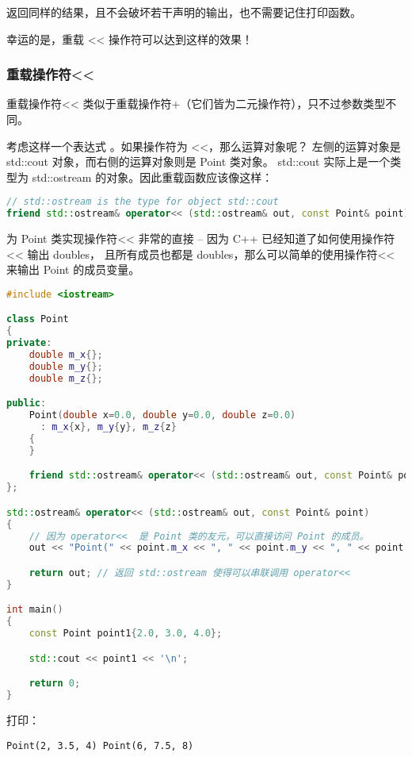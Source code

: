 \documentclass[../../LearnCpp.tex]{subfiles}
\begin{document}
返回同样的结果，且不会破坏若干声明的输出，也不需要记住打印函数。

幸运的是，重载 << 操作符可以达到这样的效果！

\subsubsection*{重载操作符<<}

重载操作符<< 类似于重载操作符+（它们皆为二元操作符），只不过参数类型不同。

考虑这样一个表达式 。如果操作符为 <<，那么运算对象呢？
左侧的运算对象是 std::cout 对象，而右侧的运算对象则是 Point 类对象。
std::cout 实际上是一个类型为 std::ostream 的对象。因此重载函数应该像这样：

\begin{lstlisting}[language=C++]
// std::ostream is the type for object std::cout
friend std::ostream& operator<< (std::ostream& out, const Point& point);
\end{lstlisting}

为 Point 类实现操作符<< 非常的直接 -- 因为 C++ 已经知道了如何使用操作符<< 输出 doubles，
且所有成员也都是 doubles，那么可以简单的使用操作符<< 来输出 Point 的成员变量。

\begin{lstlisting}[language=C++]
#include <iostream>

class Point
{
private:
    double m_x{};
    double m_y{};
    double m_z{};

public:
    Point(double x=0.0, double y=0.0, double z=0.0)
      : m_x{x}, m_y{y}, m_z{z}
    {
    }

    friend std::ostream& operator<< (std::ostream& out, const Point& point);
};

std::ostream& operator<< (std::ostream& out, const Point& point)
{
    // 因为 operator<<  是 Point 类的友元，可以直接访问 Point 的成员。
    out << "Point(" << point.m_x << ", " << point.m_y << ", " << point.m_z << ')'; // 真实输出在这里完成

    return out; // 返回 std::ostream 使得可以串联调用 operator<<
}

int main()
{
    const Point point1{2.0, 3.0, 4.0};

    std::cout << point1 << '\n';

    return 0;
}
\end{lstlisting}

打印：

\begin{lstlisting}
Point(2, 3.5, 4) Point(6, 7.5, 8)
\end{lstlisting}
\end{document}

